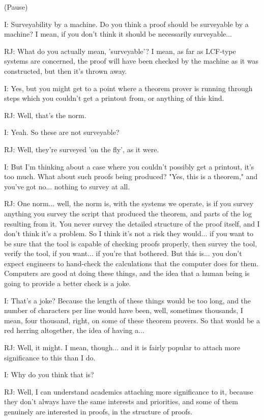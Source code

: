 \documentclass[10pt,titlepage]{book}
\begin{document}
(Pause)

I: Surveyability by a machine. Do you think a proof should be surveyable by a machine? I mean, if you don't think it should be necessarily surveyable...

RJ: What do you actually mean, 'surveyable'? I mean, as far as LCF-type systems are concerned, the proof will have been checked by the machine as it was constructed, but then it's thrown away.

I: Yes, but you might get to a point where a theorem prover is running through steps which you couldn't get a printout from, or anything of this kind.

RJ: Well, that's the norm.

I: Yeah. So these are not surveyable?

RJ: Well, they're surveyed 'on the fly', as it were.

I: But I'm thinking about a case where you couldn't possibly get a printout, it's too much. What about such proofs being produced? "Yes, this is a theorem," and you've got no... nothing to survey at all.

RJ: One norm... well, the norm is, with the systems we operate, is if you survey anything you survey the script that produced the theorem, and parts of the log resulting from it. You never survey the detailed structure of the proof itself, and I don't think it's a problem. So I think it's not a risk they would... if you want to be sure that the tool is capable of checking proofs properly, then survey the tool, verify the tool, if you want... if you're that bothered. But this is... you don't expect engineers to hand-check the calculations that the computer does for them. Computers are good at doing these things, and the idea that a human being is going to provide a better check is a joke.

I: That's a joke? Because the length of these things would be too long, and the number of characters per line would have been, well, sometimes thousands, I mean, four thousand, right, on some of these theorem provers. So that would be a red herring altogether, the idea of having a...

RJ: Well, it might. I mean, though... and it is fairly popular to attach more significance to this than I do.

I: Why do you think that is?

RJ: Well, I can understand academics attaching more significance to it, because they don't always have the same interests and priorities, and some of them genuinely are interested in proofs, in the structure of proofs.
\end{document}
